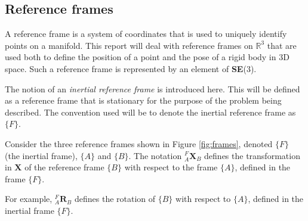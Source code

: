 		\begin{comment}		
		\textbf{Adjoint Map}\\
		EXPLANATION\\
		The adjoint map of $\mathbf{SE}(3)$ is
		\begin{equation}
			\Psi_S: \mathbf{SE}(3) \rightarrow \mathbf{SE}(3) \textnormal{, }
			\Psi_S(A) \stackrel{\Delta}{=} SAS^{-1}
		\end{equation}
		Taking the derivative:
		\begin{equation}
			\frac{\partial}{\partial t} \Psi_S(A(t))|_{t=0} = SBS^{-1} \textnormal{, }
			B \stackrel{\Delta}{=} 	\frac{\partial}{\partial t}A(t)|_{t=0}
		\end{equation}
		The adjoint	representation of $\mathbf{SE}(3)$ is given by the mapping
		\begin{equation}
			\textbf{Adj}_S: \mathfrak{se}(3) \rightarrow \mathfrak{se}(3) \textnormal{, }
			\textbf{Adj}_S(B) \stackrel{\Delta}{=} SBS^{-1}
		\end{equation}
		\end{comment}
		
	\subsection{Reference frames}
		A reference frame is a system of coordinates that is used to uniquely identify points on a manifold. This report will deal with reference frames on $\mathbb{R}^3$ that are used both to define the position of a point and the pose of a rigid body in 3D space.
		Such a reference frame is represented by an element of \textbf{SE}(3).
		
		The notion of an \textit{inertial reference frame} is introduced here. This will be defined as a reference frame that is stationary for the purpose of the problem being described. The convention used will be to denote the inertial reference frame as $\{F\}$.
		
		Consider the three reference frames shown in Figure \ref{fig:frames}, denoted $\{F\}$ (the inertial frame), $\{A\}$ and $\{B\}$.
		The notation $^{F}_{A}\mathbf{X}^{}_{B}$ defines the transformation in $\mathbf{X}$ of the reference frame $\{B\}$ with respect to the frame $\{A\}$, defined in the frame $\{F\}$.
		
		
		For example, $^{F}_{A}\mathbf{R}^{}_{B}$ defines the rotation of $\{B\}$ with respect to $\{A\}$, defined in the inertial frame $\{F\}$.		
		
